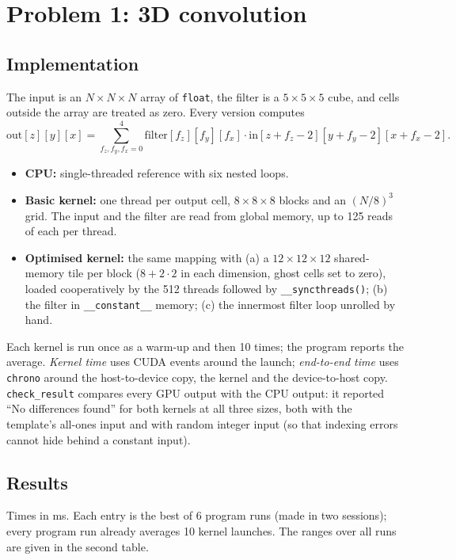 \documentclass[11pt]{article}
\begin{document}
\section*{Problem 1: 3D convolution}

\subsection*{Implementation}
The input is an $N\times N\times N$ array of \texttt{float}, the filter is a
$5\times5\times5$ cube, and cells outside the array are treated as zero.
Every version computes
\[
\mathrm{out}[z][y][x]=\sum_{f_z,f_y,f_x=0}^{4}
 \mathrm{filter}[f_z][f_y][f_x]\cdot \mathrm{in}[z+f_z-2][y+f_y-2][x+f_x-2].
\]
\begin{itemize}
\item \textbf{CPU:} single-threaded reference with six nested loops.
\item \textbf{Basic kernel:} one thread per output cell, $8\times8\times8$
 blocks and an $(N/8)^3$ grid. The input and the filter are read from global
 memory, up to 125 reads of each per thread.
\item \textbf{Optimised kernel:} the same mapping with
 (a) a $12\times12\times12$ shared-memory tile per block ($8+2\cdot 2$ in each
 dimension, ghost cells set to zero), loaded cooperatively by the 512 threads
 followed by \texttt{\_\_syncthreads()};
 (b) the filter in \texttt{\_\_constant\_\_} memory;
 (c) the innermost filter loop unrolled by hand.
\end{itemize}
Each kernel is run once as a warm-up and then 10 times; the program reports
the average. \emph{Kernel time} uses CUDA events around the launch;
\emph{end-to-end time} uses \texttt{chrono} around the host-to-device copy,
the kernel and the device-to-host copy. \texttt{check\_result} compares every
GPU output with the CPU output: it reported ``No differences found'' for both
kernels at all three sizes, both with the template's all-ones input and with
random integer input (so that indexing errors cannot hide behind a constant
input).

\subsection*{Results}
Times in ms. Each entry is the best of 6 program runs (made in two
sessions); every program run already averages 10 kernel launches. The ranges
over all runs are given in the second table.
\end{document}
